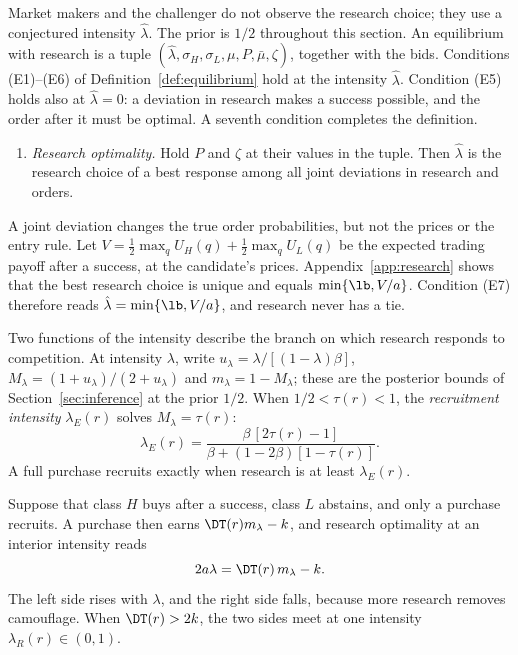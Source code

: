 Market makers and the challenger do not observe the research choice; they use a conjectured intensity
\(\hat\lambda\). The prior is \(1/2\) throughout this section. An equilibrium with research is a tuple \((\hat\lambda,\sigma_H,\sigma_L,\mu,P,\bar\mu,\zeta)\), together with the
bids. Conditions (E1)--(E6) of Definition~\ref{def:equilibrium} hold at the intensity \(\hat\lambda\). Condition
(E5) holds also at \(\hat\lambda=0\): a deviation in research makes a success possible, and the order after it must
be optimal. A seventh condition completes the definition.
\begin{enumerate}[label=(E\arabic*),start=7,leftmargin=3em]
\item \emph{Research optimality.} Hold \(P\) and \(\zeta\) at their values in the tuple. Then \(\hat\lambda\) is
the research choice of a best response among all joint deviations in research and orders.
\end{enumerate}
A joint deviation changes the true order probabilities, but not the prices or the entry rule. Let
\(V=\tfrac12\max_qU_H(q)+\tfrac12\max_qU_L(q)\) be the expected trading payoff after a success, at the candidate's
prices. Appendix~\ref{app:research} shows that the best research choice is unique and equals
\(\min\{\lb,V/a\}\). Condition (E7) therefore reads \(\hat\lambda=\min\{\lb,V/a\}\), and research never has a tie.

Two functions of the intensity describe the branch on which research responds to competition. At intensity
\(\lambda\), write \(u_\lambda=\lambda/[(1-\lambda)\beta]\), \(M_\lambda=(1+u_\lambda)/(2+u_\lambda)\) and
\(m_\lambda=1-M_\lambda\); these are the posterior bounds of Section~\ref{sec:inference} at the prior \(1/2\). When
\(1/2<\tau(r)<1\), the \emph{recruitment intensity} \(\lambda_E(r)\) solves \(M_\lambda=\tau(r)\):
\[
\lambda_E(r)=\frac{\beta\,[2\tau(r)-1]}{\beta+(1-2\beta)[1-\tau(r)]}.
\]
A full purchase recruits exactly when research is at least \(\lambda_E(r)\).

 Suppose that class \(H\) buys after a
success, class \(L\) abstains, and only a purchase recruits. A purchase then earns \(\DT(r)m_\lambda-k\), and
research optimality at an interior intensity reads
\begin{equation}\label{eq:research}
2a\lambda=\DT(r)\,m_\lambda-k .
\end{equation}
The left side rises with \(\lambda\), and the right side falls, because more research removes camouflage. When
\(\DT(r)>2k\), the two sides meet at one intensity \(\lambda_R(r)\in(0,1)\).

